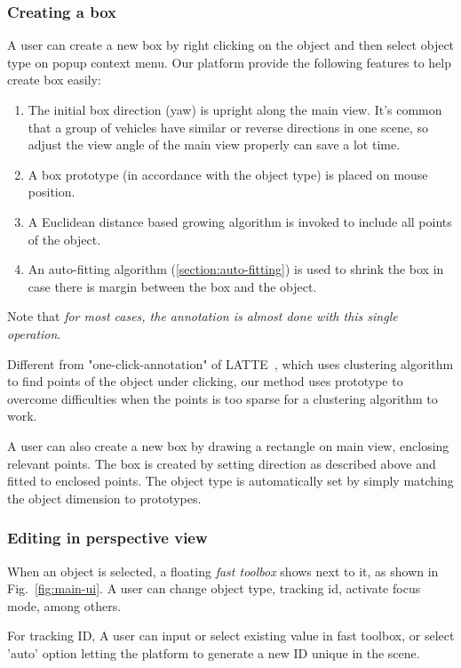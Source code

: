 \documentclass[letterpaper, 10 pt, conference]{ieeeconf}  %
\begin{document}
\subsubsection{Creating a box}
\label{section:create-box}
A user can create a new box by right clicking on the object  and then select object type on popup context menu. Our platform provide the following features to help create box easily:

\begin{enumerate}
	\item The initial box direction (yaw) is upright along the main view. It's common that a group of vehicles have similar or reverse directions in one scene, so adjust the view angle of the main view properly can save a lot time.
	\item A box prototype (in accordance with the object type) is placed on mouse position.
	\item A Euclidean distance based growing algorithm is invoked to include all points of the object.
	\item An auto-fitting algorithm (\ref{section:auto-fitting}) is used to shrink the box in case there is margin between the box and the object.
\end{enumerate}

Note that \emph{for most cases, the annotation is almost done with this single operation}.

Different from "one-click-annotation" of LATTE~\cite{pointatme}, which uses clustering algorithm to find points of the object under clicking, our method uses prototype to overcome difficulties when the points is too sparse for a clustering algorithm to work.

A user can also create a new box by drawing a rectangle on main view,  enclosing relevant points. The box is created by setting direction  as described above and fitted to enclosed points. The object type is automatically set by simply matching the object dimension to prototypes.


\subsubsection{Editing in perspective view}

When an object is selected, a floating \emph{fast toolbox} shows next to it, as shown in Fig.~\ref{fig:main-ui}. A user can change object type, tracking id, activate focus mode, among others.

For tracking ID, A user  can input or select existing value in fast toolbox, or select 'auto' option  letting the platform to generate a new ID unique in the scene.
\end{document}
